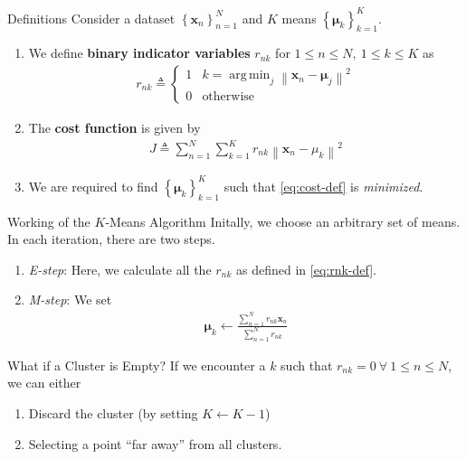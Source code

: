 \documentclass{beamer}
\DeclareMathOperator*{\argmin}{arg\,min}
\providecommand{\cbrak}[1]{\ensuremath{\left\{#1\right\}}}
\theoremstyle{remark}
\providecommand{\norm}[1]{\left\lVert#1\right\rVert}
\renewcommand{\vec}[1]{\boldsymbol{\mathbf{#1}}}
\begin{document}
\begin{frame}{Definitions}
    Consider a dataset $\cbrak{\vec{x}_n}_{n=1}^N$ and $K$ means
    $\cbrak{\vec{\mu}_k}_{k=1}^K$.
    \pause
    \begin{enumerate}
        \item We define \textbf{binary indicator variables} $r_{nk}$ for 
        $1 \le n \le N,\ 1 \le k \le K$ as
            \begin{align}
                r_{nk} \triangleq
                \begin{cases}
                    1 & k = \argmin_j\norm{\vec{x}_n-\vec{\mu}_j}^2 \\
                    0 & \textrm{otherwise}
                \end{cases}
                \label{eq:rnk-def}
            \end{align}
        \pause
        \item The \textbf{cost function} is given by
            \begin{align}
                J \triangleq \sum_{n=1}^N\sum_{k=1}^Kr_{nk}\norm{\vec{x}_n-\mu_{k}}^2
                \label{eq:cost-def}
            \end{align}
        \pause
        \item We are required to find $\cbrak{\vec{\mu}_k}_{k=1}^K$ such that
        \eqref{eq:cost-def} is \textit{minimized}.
    \end{enumerate}
\end{frame}

\begin{frame}{Working of the $K$-Means Algorithm}
    Initally, we choose an arbitrary set of means. In each iteration, there are 
    two steps.
    \pause
    \begin{enumerate}
        \item \textit{E-step}: Here, we calculate all the $r_{nk}$ as defined
            in \eqref{eq:rnk-def}.
        \pause
        \item \textit{M-step}: We set
            \begin{align}
                \vec{\mu}_k \leftarrow \frac{\sum_{n=1}^Nr_{nk}\vec{x}_n}{\sum_{n=1}^Nr_{nk}}
                \label{eq:M-step}
            \end{align}
        \pause
    \end{enumerate}
    \begin{alertblock}{What if a Cluster is Empty?}
        If we encounter a $k$ such that $r_{nk} = 0\ \forall\ 1 \le n \le 
        N$, we can either
        \pause
        \begin{enumerate}
            \item Discard the cluster (by setting $K \leftarrow K - 1$)
            \pause
            \item Selecting a point ``far away'' from all clusters.
        \end{enumerate}
    \end{alertblock}
\end{frame}
\end{document}
